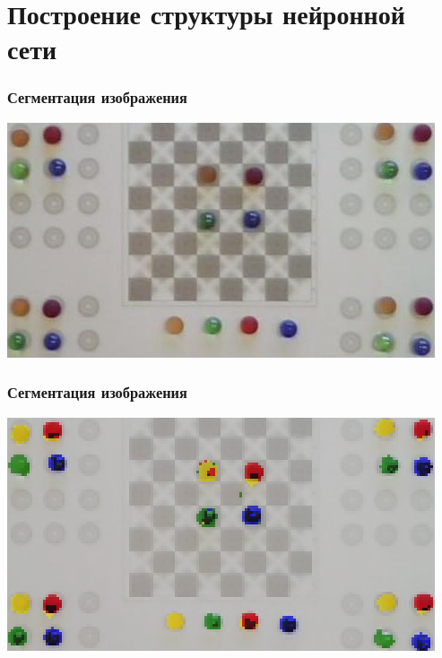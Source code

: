 \documentclass[24pt,pdf,hyperref={unicode},aspectratio=169]{beamer}
\begin{document}
\section{Построение структуры нейронной сети}

\begin{frame}\frametitle{Сегментация изображения}
\includegraphics[width=\textwidth]{Images/Checkers-raw.png} 
\end{frame}

\begin{frame}\frametitle{Сегментация изображения}
\includegraphics[width=\textwidth]{Images/Checkers-segmented.png} 
\end{frame}
\end{document}
